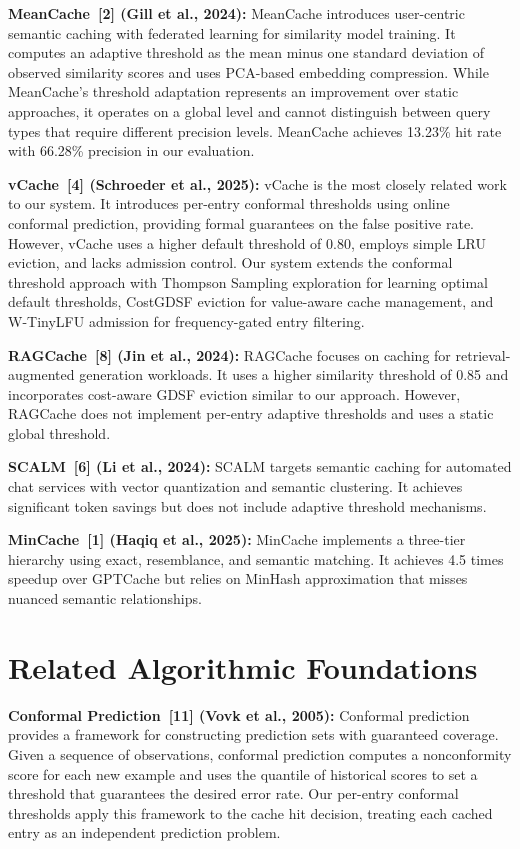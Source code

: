 \documentclass[12pt,a4paper]{report}
\begin{document}
\textbf{MeanCache~[2] (Gill et al., 2024):} MeanCache introduces user-centric semantic caching with federated learning for similarity model training. It computes an adaptive threshold as the mean minus one standard deviation of observed similarity scores and uses PCA-based embedding compression. While MeanCache's threshold adaptation represents an improvement over static approaches, it operates on a global level and cannot distinguish between query types that require different precision levels. MeanCache achieves 13.23\% hit rate with 66.28\% precision in our evaluation.

\textbf{vCache~[4] (Schroeder et al., 2025):} vCache is the most closely related work to our system. It introduces per-entry conformal thresholds using online conformal prediction, providing formal guarantees on the false positive rate. However, vCache uses a higher default threshold of 0.80, employs simple LRU eviction, and lacks admission control. Our system extends the conformal threshold approach with Thompson Sampling exploration for learning optimal default thresholds, CostGDSF eviction for value-aware cache management, and W-TinyLFU admission for frequency-gated entry filtering.

\textbf{RAGCache~[8] (Jin et al., 2024):} RAGCache focuses on caching for retrieval-augmented generation workloads. It uses a higher similarity threshold of 0.85 and incorporates cost-aware GDSF eviction similar to our approach. However, RAGCache does not implement per-entry adaptive thresholds and uses a static global threshold.

\textbf{SCALM~[6] (Li et al., 2024):} SCALM targets semantic caching for automated chat services with vector quantization and semantic clustering. It achieves significant token savings but does not include adaptive threshold mechanisms.

\textbf{MinCache~[1] (Haqiq et al., 2025):} MinCache implements a three-tier hierarchy using exact, resemblance, and semantic matching. It achieves 4.5 times speedup over GPTCache but relies on MinHash approximation that misses nuanced semantic relationships.

\section{Related Algorithmic Foundations}

\textbf{Conformal Prediction~[11] (Vovk et al., 2005):} Conformal prediction provides a framework for constructing prediction sets with guaranteed coverage. Given a sequence of observations, conformal prediction computes a nonconformity score for each new example and uses the quantile of historical scores to set a threshold that guarantees the desired error rate. Our per-entry conformal thresholds apply this framework to the cache hit decision, treating each cached entry as an independent prediction problem.
\end{document}
